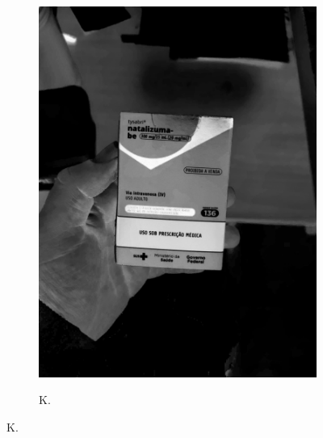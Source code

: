 \begin{figure}[htb]
\begin{subfigure}[t]{0.21\textwidth}
        \includegraphics[width=\linewidth]{../pictures/tysabri_cmyk_y_only.jpg}
    \end{subfigure}
    \hfill
    \begin{subfigure}[t]{0.21\textwidth}
        \centering
        \caption{K.}
        \label{fig:foto:versoes:2:K}

\end{subfigure}
\end{figure}
